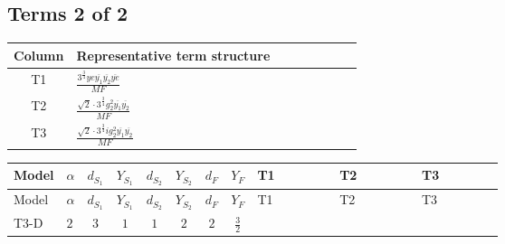 \documentclass[8pt]{article}
\begin{document}
\begin{landscape}
\subsection*{Terms 2 of 2}
\begin{center}
\begin{tabular}{@{}c >{\raggedright\arraybackslash}p{0.82\linewidth}@{}}
\toprule
Column & Representative term structure \\
\midrule
T1 & \(\displaystyle \frac{3^{\frac{3}{4}} ye \overline{y_{1}} \overline{y_{2}} \overline{ye}}{MF}\) \\
\midrule
T2 & \(\displaystyle \frac{\sqrt{2} \cdot 3^{\frac{3}{4}} g_{2}^{2} \overline{y_{1}} \overline{y_{2}}}{MF}\) \\
\midrule
T3 & \(\displaystyle \frac{\sqrt{2} \cdot 3^{\frac{3}{4}} i g_{2}^{2} \overline{y_{1}} \overline{y_{2}}}{MF}\) \\
\midrule
\bottomrule
\end{tabular}
\end{center}
\smallskip
\tiny
\begin{longtable}{@{}llcccccc >{\raggedright\arraybackslash}p{0.21\linewidth} >{\raggedright\arraybackslash}p{0.21\linewidth} >{\raggedright\arraybackslash}p{0.21\linewidth}@{}}
\toprule
Model & $\alpha$ & $d_{S_1}$ & $Y_{S_1}$ & $d_{S_2}$ & $Y_{S_2}$ & $d_F$ & $Y_F$ & T1 & T2 & T3 \\
\midrule
\endfirsthead
\toprule
Model & $\alpha$ & $d_{S_1}$ & $Y_{S_1}$ & $d_{S_2}$ & $Y_{S_2}$ & $d_F$ & $Y_F$ & T1 & T2 & T3 \\
\midrule
\endhead
T3-D & $2$ & $3$ & $1$ & $1$ & $2$ & $2$ & $\frac{3}{2}$ & \scriptsize\adjustbox{max width=\linewidth}{$\begin{gathered} - \frac{3^{\frac{3}{4}} ye \overline{y_{1}} \overline{y_{2}} \overline{ye}}{12 MF}\end{gathered}$} & \scriptsize\adjustbox{max width=\linewidth}{$\begin{gathered} \frac{\sqrt{2} \cdot 3^{\frac{3}{4}} g_{2}^{2} \overline{y_{1}} \overline{y_{2}}}{6 MF}\end{gathered}$} & \scriptsize\adjustbox{max width=\linewidth}{$\begin{gathered} \frac{\sqrt{2} \cdot 3^{\frac{3}{4}} i g_{2}^{2} \overline{y_{1}} \overline{y_{2}}}{6 MF}\end{gathered}$} \\
\midrule
\bottomrule
\end{longtable}
\clearpage

\end{landscape}
\end{document}
